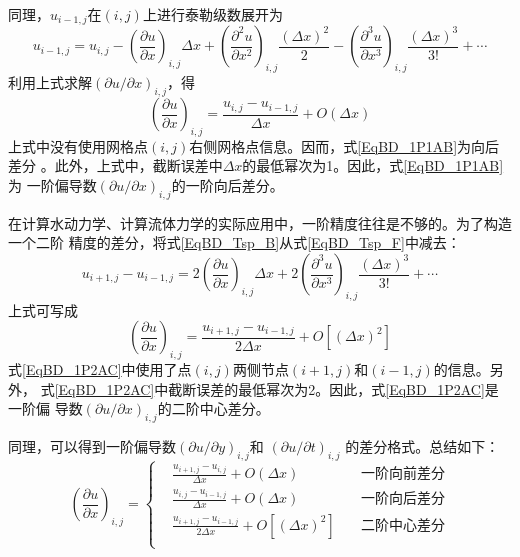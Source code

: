 同理，$u_{i-1,j}$在$(i,j)$上进行泰勒级数展开为
\begin{equation}
  u_{i-1,j}
  =
  u_{i,j} - 
  \left(
    \frac{\partial u}{\partial x}
  \right)_{i,j}
  \Delta x
  +
  \left(
    \frac{\partial^{2} u}{\partial x^{2}}
  \right)_{i,j}
  \frac{(\Delta x)^{2}}{2}
  -
  \left(
    \frac{\partial^{3} u}{\partial x^{3}}
  \right)_{i,j}
  \frac{(\Delta x)^{3}}{3!}
  +
  \cdots
  \label{EqBD_Tsp_B}
\end{equation}
利用上式求解$(\partial u/\partial x)_{i,j}$，得
\begin{equation}
  \left(
    \frac{\partial u}{\partial x}
  \right)_{i,j}
  =
  \frac{u_{i,j}-u_{i-1,j}}{\Delta x}
  +
  O(\Delta x)
  \label{EqBD_1P1AB}
\end{equation}
上式中没有使用网格点$(i,j)$右侧网格点信息。因而，式\eqref{EqBD_1P1AB}为向后差分
。此外，上式中，截断误差中$\Delta x$的最低幂次为1。因此，式\eqref{EqBD_1P1AB}为
一阶偏导数$(\partial u/\partial x)_{i,j}$的一阶向后差分。

在计算水动力学、计算流体力学的实际应用中，一阶精度往往是不够的。为了构造一个二阶
精度的差分，将式\eqref{EqBD_Tsp_B}从式\eqref{EqBD_Tsp_F}中减去：
\begin{equation}
  u_{i+1,j} - u_{i-1,j}
  =
  2
  \left(
    \frac{\partial u}{\partial x}
  \right)_{i,j}
  \Delta x
  +
  2
  \left(
    \frac{\partial^3 u}{\partial x^3}
  \right)_{i,j}
  \frac{(\Delta x)^3}{3!}
  +
  \cdots
\end{equation}
上式可写成
\begin{equation}
  \left(
    \frac{\partial u}{\partial x}
  \right)_{i,j}
  =
  \frac{u_{i+1,j} - u_{i-1,j}}{2\Delta x}
  +
  O[(\Delta x)^{2}]
  \label{EqBD_1P2AC}
\end{equation}
式\eqref{EqBD_1P2AC}中使用了点$(i,j)$两侧节点$(i+1,j)$和$(i-1,j)$的信息。另外，
式\eqref{EqBD_1P2AC}中截断误差的最低幂次为2。因此，式\eqref{EqBD_1P2AC}是一阶偏
导数$(\partial u/\partial x)_{i,j}$的二阶中心差分。

同理，可以得到一阶偏导数$(\partial u/\partial y)_{i,j}$和
$(\partial u/\partial t)_{i,j}$
的差分格式。总结如下：
\begin{equation}
  \left(
    \frac{\partial u}{\partial x}
  \right)_{i,j}
  =
  \left\{
    \begin{aligned}
      &\frac{u_{i+1,j}-u_{i,j}}{\Delta x} + O(\Delta x) & \mbox{一阶向前差分} \\
      &\frac{u_{i,j}-u_{i-1,j}}{\Delta x} + O(\Delta x) & \mbox{一阶向后差分} \\
      &\frac{u_{i+1,j}-u_{i-1,j}}{2\Delta x} + O[(\Delta x)^{2}] \quad& \mbox{二阶中心差分} \\
    \end{aligned}
  \right.
\end{equation}

